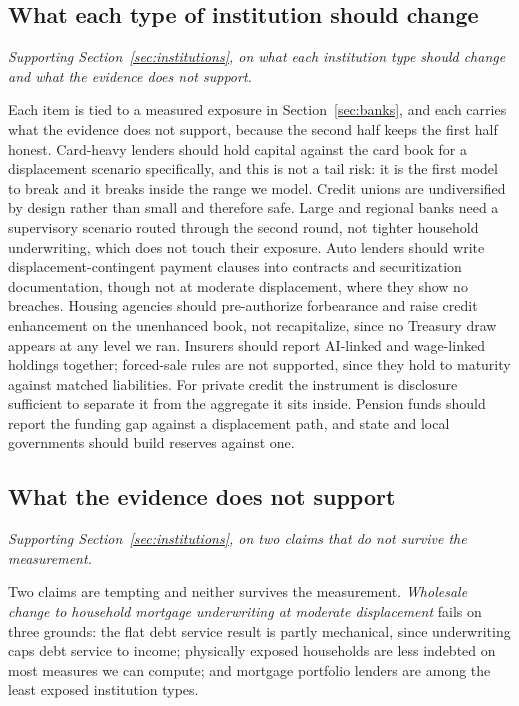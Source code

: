 \subsection{What each type of institution should change}

\emph{Supporting Section~\ref{sec:institutions}, on what each institution type should change and what the evidence does not support.}

Each item is tied to a measured exposure in Section~\ref{sec:banks}, and each carries what the
evidence does not support, because the second half keeps the first half honest. Card-heavy lenders
should hold capital against the card book for a displacement scenario specifically, and this is
not a tail risk: it is the first model to break and it breaks inside the range we model. Credit
unions are undiversified by design rather than small and therefore safe. Large and regional banks
need a supervisory scenario routed through the second round, not tighter household underwriting,
which does not touch their exposure. Auto lenders should write displacement-contingent payment
clauses into contracts and securitization documentation, though not at moderate displacement,
where they show no breaches. Housing agencies should pre-authorize forbearance and raise credit
enhancement on the unenhanced book, not recapitalize, since no Treasury draw appears at any level
we ran. Insurers should report AI-linked and wage-linked holdings together; forced-sale rules are
not supported, since they hold to maturity against matched liabilities. For private credit the
instrument is disclosure sufficient to separate it from the aggregate it sits inside. Pension
funds should report the funding gap against a displacement path, and state and local governments
should build reserves against one.

\subsection{What the evidence does not support}

\emph{Supporting Section~\ref{sec:institutions}, on two claims that do not survive the measurement.}

Two claims are tempting and neither survives the measurement. \emph{Wholesale change to household
mortgage underwriting at moderate displacement} fails on three grounds: the flat debt service
result is partly mechanical, since underwriting caps debt service to income; physically exposed
households are less indebted on most measures we can compute; and mortgage portfolio lenders are
among the least exposed institution types.

